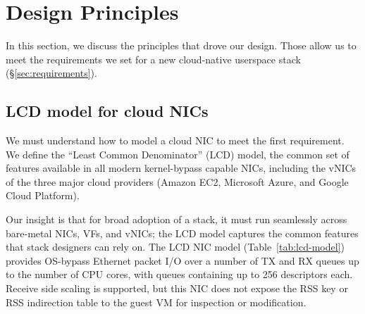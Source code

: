\section{Design Principles}
\label{sec:design-principles}

In this section, we discuss the principles that drove our design. Those allow us to meet the requirements we set for a new cloud-native userspace stack (\S\ref{sec:requirements}).

\subsection{LCD model for cloud NICs}
\label{sec:lcd-cloudvnic}
We must understand how to model a cloud NIC to meet the first requirement.
We define the ``Least Common Denominator'' (LCD) model, the common set of features available in all modern kernel-bypass capable NICs, including the vNICs of the three major cloud providers (Amazon EC2, Microsoft Azure, and Google Cloud Platform).

Our insight is that for broad adoption of a stack, it must run seamlessly across bare-metal NICs, VFs, and vNICs; the LCD model captures the common features that stack designers can rely on.
The LCD NIC model (Table~\ref{tab:lcd-model}) provides OS-bypass Ethernet packet I/O over a number of TX and RX queues up to the number of CPU cores, with queues containing up to 256 descriptors each. Receive side scaling is supported, but this NIC does not expose the RSS key or RSS indirection table to the guest VM for inspection or modification. %

\begin{table}
    \centering
    \begin{minipage}{.9\columnwidth}
        \centering
    \end{minipage}
    \caption{Least common denominator NIC model in \mt{}}
    \label{tab:lcd-model}
\end{table}

